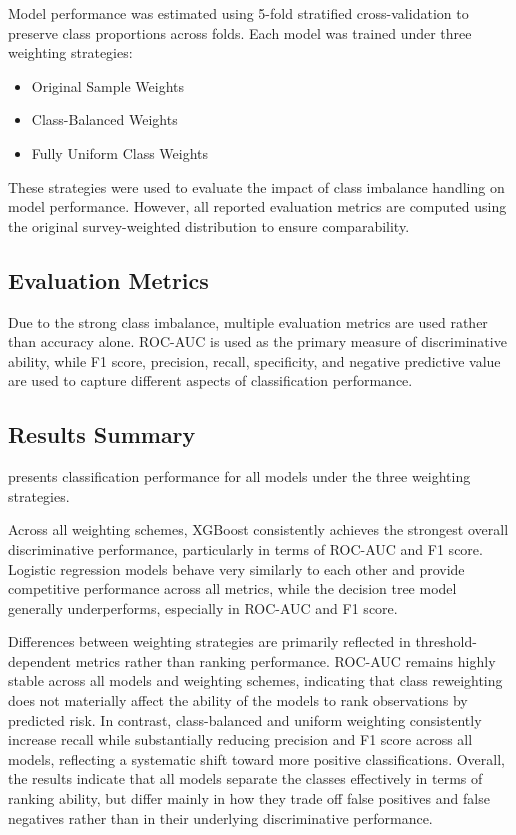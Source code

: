 Model performance was estimated using 5-fold stratified cross-validation to preserve class proportions across folds. Each model was trained under three weighting strategies:

\begin{itemize}
    \item Original Sample Weights
    \item Class-Balanced Weights
    \item Fully Uniform Class Weights
\end{itemize}

These strategies were used to evaluate the impact of class imbalance handling on model performance. However, all reported evaluation metrics are computed using the original survey-weighted distribution to ensure comparability.

\subsection{Evaluation Metrics}

Due to the strong class imbalance, multiple evaluation metrics are used rather than accuracy alone. ROC-AUC is used as the primary measure of discriminative ability, while F1 score, precision, recall, specificity, and negative predictive value are used to capture different aspects of classification performance.

\subsection{Results Summary}

 presents classification performance for all models under the three weighting strategies.

Across all weighting schemes, XGBoost consistently achieves the strongest overall discriminative performance, particularly in terms of ROC-AUC and F1 score. Logistic regression models behave very similarly to each other and provide competitive performance across all metrics, while the decision tree model generally underperforms, especially in ROC-AUC and F1 score.

Differences between weighting strategies are primarily reflected in threshold-dependent metrics rather than ranking performance. ROC-AUC remains highly stable across all models and weighting schemes, indicating that class reweighting does not materially affect the ability of the models to rank observations by predicted risk. In contrast, class-balanced and uniform weighting consistently increase recall while substantially reducing precision and F1 score across all models, reflecting a systematic shift toward more positive classifications. Overall, the results indicate that all models separate the classes effectively in terms of ranking ability, but differ mainly in how they trade off false positives and false negatives rather than in their underlying discriminative performance.

